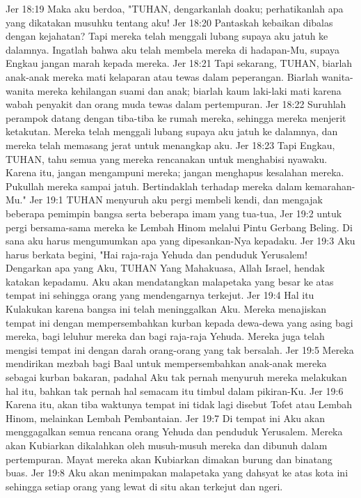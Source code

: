 Jer 18:19  Maka aku berdoa, "TUHAN, dengarkanlah doaku; perhatikanlah apa yang dikatakan musuhku tentang aku!
Jer 18:20  Pantaskah kebaikan dibalas dengan kejahatan? Tapi mereka telah menggali lubang supaya aku jatuh ke dalamnya. Ingatlah bahwa aku telah membela mereka di hadapan-Mu, supaya Engkau jangan marah kepada mereka.
Jer 18:21  Tapi sekarang, TUHAN, biarlah anak-anak mereka mati kelaparan atau tewas dalam peperangan. Biarlah wanita-wanita mereka kehilangan suami dan anak; biarlah kaum laki-laki mati karena wabah penyakit dan orang muda tewas dalam pertempuran.
Jer 18:22  Suruhlah perampok datang dengan tiba-tiba ke rumah mereka, sehingga mereka menjerit ketakutan. Mereka telah menggali lubang supaya aku jatuh ke dalamnya, dan mereka telah memasang jerat untuk menangkap aku.
Jer 18:23  Tapi Engkau, TUHAN, tahu semua yang mereka rencanakan untuk menghabisi nyawaku. Karena itu, jangan mengampuni mereka; jangan menghapus kesalahan mereka. Pukullah mereka sampai jatuh. Bertindaklah terhadap mereka dalam kemarahan-Mu."
Jer 19:1  TUHAN menyuruh aku pergi membeli kendi, dan mengajak beberapa pemimpin bangsa serta beberapa imam yang tua-tua,
Jer 19:2  untuk pergi bersama-sama mereka ke Lembah Hinom melalui Pintu Gerbang Beling. Di sana aku harus mengumumkan apa yang dipesankan-Nya kepadaku.
Jer 19:3  Aku harus berkata begini, "Hai raja-raja Yehuda dan penduduk Yerusalem! Dengarkan apa yang Aku, TUHAN Yang Mahakuasa, Allah Israel, hendak katakan kepadamu. Aku akan mendatangkan malapetaka yang besar ke atas tempat ini sehingga orang yang mendengarnya terkejut.
Jer 19:4  Hal itu Kulakukan karena bangsa ini telah meninggalkan Aku. Mereka menajiskan tempat ini dengan mempersembahkan kurban kepada dewa-dewa yang asing bagi mereka, bagi leluhur mereka dan bagi raja-raja Yehuda. Mereka juga telah mengisi tempat ini dengan darah orang-orang yang tak bersalah.
Jer 19:5  Mereka mendirikan mezbah bagi Baal untuk mempersembahkan anak-anak mereka sebagai kurban bakaran, padahal Aku tak pernah menyuruh mereka melakukan hal itu, bahkan tak pernah hal semacam itu timbul dalam pikiran-Ku.
Jer 19:6  Karena itu, akan tiba waktunya tempat ini tidak lagi disebut Tofet atau Lembah Hinom, melainkan Lembah Pembantaian.
Jer 19:7  Di tempat ini Aku akan menggagalkan semua rencana orang Yehuda dan penduduk Yerusalem. Mereka akan Kubiarkan dikalahkan oleh musuh-musuh mereka dan dibunuh dalam pertempuran. Mayat mereka akan Kubiarkan dimakan burung dan binatang buas.
Jer 19:8  Aku akan menimpakan malapetaka yang dahsyat ke atas kota ini sehingga setiap orang yang lewat di situ akan terkejut dan ngeri.
